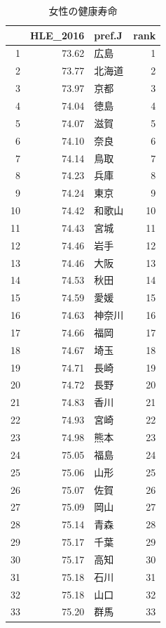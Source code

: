 \begin{table}[ht]
\centering
\footnotesize
\caption{女性の健康寿命}
\begin{tabular}{rrlr}
  \hline
 & HLE\_2016 & pref.J & rank \\ 
  \hline
1 & 73.62 & 広島 &   1 \\ 
  2 & 73.77 & 北海道 &   2 \\ 
  3 & 73.97 & 京都 &   3 \\ 
  4 & 74.04 & 徳島 &   4 \\ 
  5 & 74.07 & 滋賀 &   5 \\ 
  6 & 74.10 & 奈良 &   6 \\ 
  7 & 74.14 & 鳥取 &   7 \\ 
  8 & 74.23 & 兵庫 &   8 \\ 
  9 & 74.24 & 東京 &   9 \\ 
  10 & 74.42 & 和歌山 &  10 \\ 
  11 & 74.43 & 宮城 &  11 \\ 
  12 & 74.46 & 岩手 &  12 \\ 
  13 & 74.46 & 大阪 &  13 \\ 
  14 & 74.53 & 秋田 &  14 \\ 
  15 & 74.59 & 愛媛 &  15 \\ 
  16 & 74.63 & 神奈川 &  16 \\ 
  17 & 74.66 & 福岡 &  17 \\ 
  18 & 74.67 & 埼玉 &  18 \\ 
  19 & 74.71 & 長崎 &  19 \\ 
  20 & 74.72 & 長野 &  20 \\ 
  21 & 74.83 & 香川 &  21 \\ 
  22 & 74.93 & 宮崎 &  22 \\ 
  23 & 74.98 & 熊本 &  23 \\ 
  24 & 75.05 & 福島 &  24 \\ 
  25 & 75.06 & 山形 &  25 \\ 
  26 & 75.07 & 佐賀 &  26 \\ 
  27 & 75.09 & 岡山 &  27 \\ 
  28 & 75.14 & 青森 &  28 \\ 
  29 & 75.17 & 千葉 &  29 \\ 
  30 & 75.17 & 高知 &  30 \\ 
  31 & 75.18 & 石川 &  31 \\ 
  32 & 75.18 & 山口 &  32 \\ 
  33 & 75.20 & 群馬 &  33 \\ 

\end{tabular}
\end{table}
